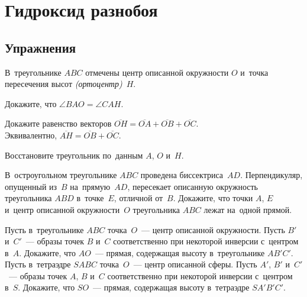 
\section*{Гидроксид разнобоя}


\subsection*{Упражнения}

В~треугольнике $ABC$ отмечены центр описанной окружности $O$
и~точка пересечения высот \emph{(ортоцентр)}~$H$.

\begingroup
    \let\vect\overline

\begin{problems}

\item {}
Докажите, что $\angle BAO = \angle CAH$.

\item {}
Докажите равенство векторов $\vect{OH} = \vect{OA} + \vect{OB} + \vect{OC}$.
\\
Эквивалентно, $\vect{AH} = \vect{OB} + \vect{OC}$.

\item
Восстановите треугольник по~данным $A$, $O$ и~$H$.

\item
В~остроугольном треугольнике $ABC$ проведена биссектриса~$AD$.
Перпендикуляр, опущенный из~$B$ на~прямую~$AD$, пересекает описанную окружность
треугольника $ABD$ в~точке~$E$, отличной от~$B$.
Докажите, что точки $A$, $E$ и~центр описанной окружности~$O$
треугольника $ABC$ лежат на~одной прямой.

\item
\subproblem
Пусть в~треугольнике $ABC$ точка~$O$~--- центр описанной окружности.
Пусть $B'$ и~$C'$~--- образы точек $B$ и~$C$ соответственно при некоторой
инверсии с~центром в~$A$.
Докажите, что $AO$~--- прямая, содержащая высоту в~треугольнике $AB'C'$.
\\
\subproblem
Пусть в~тетраэдре $SABC$ точка~$O$~--- центр описанной сферы.
Пусть $A'$, $B'$ и~$C'$~--- образы точек $A$, $B$ и~$C$ соответственно при
некоторой инверсии с~центром в~$S$.
Докажите, что $SO$~--- прямая, содержащая высоту в~тетраэдре $SA'B'C'$.

\end{problems}


